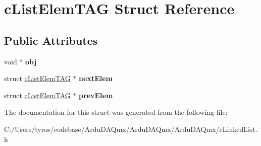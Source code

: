 \hypertarget{structc_list_elem_t_a_g}{}\section{c\+List\+Elem\+T\+AG Struct Reference}
\label{structc_list_elem_t_a_g}
\subsection*{Public Attributes}
\begin{DoxyCompactItemize}
\item 
\mbox{\label{structc_list_elem_t_a_g_a442ba5668d8285b67e9486d52a8f95a2}} 
void $\ast$ {\bfseries obj}
\item 
\mbox{\label{structc_list_elem_t_a_g_a1cacd74d17bcd3c27fcd74c544eeecb4}} 
struct \mbox{\hyperlink{structc_list_elem_t_a_g}{c\+List\+Elem\+T\+AG}} $\ast$ {\bfseries next\+Elem}
\item 
\mbox{\label{structc_list_elem_t_a_g_a563abebeaccea17de149b4baf1803bc2}} 
struct \mbox{\hyperlink{structc_list_elem_t_a_g}{c\+List\+Elem\+T\+AG}} $\ast$ {\bfseries prev\+Elem}
\end{DoxyCompactItemize}


The documentation for this struct was generated from the following file\+:\begin{DoxyCompactItemize}
\item 
C\+:/\+Users/tyros/codebase/\+Ardu\+D\+A\+Qmx/\+Ardu\+D\+A\+Qmx/\+Ardu\+D\+A\+Qmx/c\+Linked\+List.\+h\end{DoxyCompactItemize}
